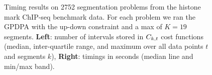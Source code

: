 \documentclass{article}
\begin{document}





\begin{figure}[b!]
  \centering
  \parbox{0.49\textwidth}{
    
  }
  \parbox{0.49\textwidth}{
    
  }
  \vskip -0.5cm
  \caption{Timing results on 2752 segmentation problems from the
    histone mark ChIP-seq benchmark data. For each problem we ran the
    GPDPA with the up-down constraint and a max of $K=19$
    segments.  \textbf{Left}: number of intervals stored in
    $C_{k,t}$ cost functions (median, inter-quartile range, and
    maximum over all data points $t$ and segments $k$),
    \textbf{Right}: timings in seconds (median line and min/max
    band).}
  \label{fig:timings}
\end{figure}
\end{document}
